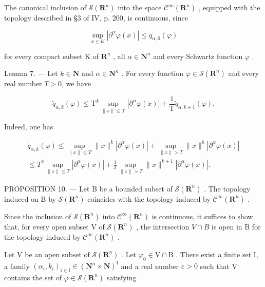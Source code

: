 The canonical inclusion of \(\mathcal{S}(\mathbf{R}^{n})\) into the space \(\mathcal{C}^{\infty}(\mathbf{R}^{n})\) , equipped with the topology described in §3 of IV, p. 200, is continuous, since

\[
\sup _ {x \in K} | \partial^ {\alpha} \varphi (x) | \leqslant q _ {\alpha , 0} (\varphi)
\]

for every compact subset K of \(\mathbf{R}^{n}\) , all \(\alpha \in \mathbf{N}^{n}\) and every Schwartz function \(\varphi\) .

Lemma 7. --- Let \(k \in \mathbf{N}\) and \(\alpha \in \mathbf{N}^n\) . For every function \(\varphi \in \mathcal{S}(\mathbf{R}^n)\) and every real number \(T > 0\), we have

\[
\widetilde {q} _ {\alpha , k} (\varphi) \leqslant \mathrm{T} ^ {k} \sup _ {\| x \| \leqslant \mathrm{T}} | \partial^ {\alpha} \varphi (x) | + \frac {1}{\mathrm{T}} \widetilde {q} _ {\alpha , k + 1} (\varphi).\tag{3}
\]

Indeed, one has

\[
\begin{array}{c} \widetilde {q} _ {\alpha , k} (\varphi) \leqslant \sup _ {\| x \| \leqslant T} \| x \| ^ {k} | \partial^ {\alpha} \varphi (x) | + \sup _ {\| x \| > T} \| x \| ^ {k} | \partial^ {\alpha} \varphi (x) | \\ \leqslant T ^ {k} \sup _ {\| x \| \leqslant T} | \partial^ {\alpha} \varphi (x) | + \frac {1}{T} \sup _ {\| x \| > T} \| x \| ^ {k + 1} | \partial^ {\alpha} \varphi (x) |. \end{array}
\]

PROPOSITION 10. --- Let B be a bounded subset of \(\mathcal{S}(\mathbf{R}^{n})\) . The topology induced on B by \(\mathcal{S}(\mathbf{R}^{n})\) coincides with the topology induced by \(\mathcal{C}^{\infty}(\mathbf{R}^{n})\) .

Since the inclusion of \(\mathcal{S}(\mathbf{R}^{n})\) into \(\mathcal{C}^{\infty}(\mathbf{R}^{n})\) is continuous, it suffices to show that, for every open subset V of \(\mathcal{S}(\mathbf{R}^{n})\) , the intersection \(V \cap B\) is open in B for the topology induced by \(\mathcal{C}^{\infty}(\mathbf{R}^{n})\) .

Let V be an open subset of \(\mathcal{S}(\mathbf{R}^{n})\) . Let \(\varphi_{0} \in \mathrm{V} \cap \mathrm{B}\) . There exist a finite set I, a family \((\alpha_{i}, k_{i})_{i \in \mathrm{I}} \in (\mathbf{N}^{n} \times \mathbf{N})^{\mathrm{I}}\) and a real number \(\varepsilon > 0\) such that V contains the set of \(\varphi \in \mathcal{S}(\mathbf{R}^{n})\) satisfying

